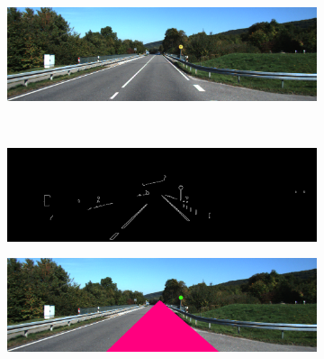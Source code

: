 \documentclass[twoside,onecolumn]{article}
\theoremstyle{definition}
\begin{document}
\begin{figure} \centering
\begin{subfigure}{0.8\textwidth}
  \includegraphics[width=\textwidth]{../images/road2.png}
\caption{ }\label{fig:r2fig}
\end{subfigure} \\
\begin{subfigure}{0.8\textwidth}
\includegraphics[width=\textwidth]{../results/edgeMap_road2.png}
\caption{}\label{fig:road2edges}
\end{subfigure}
  \begin{subfigure}{0.8\textwidth}
\includegraphics[width=\textwidth]{../results/Circles_road2.png}
\caption{}\label{fig:road2circles}
\end{subfigure}\caption{}\label{fig:road2}
\end{figure}
\end{document}
